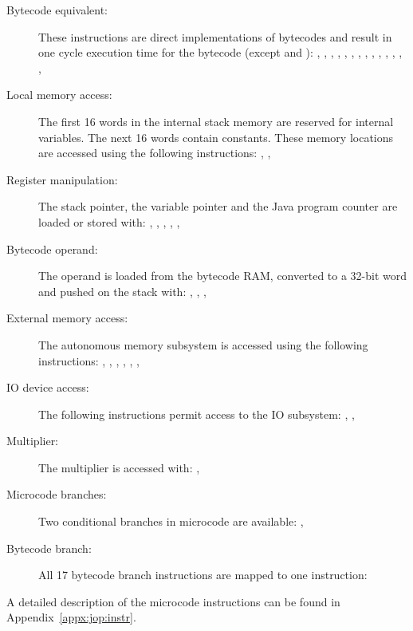 \begin{description}
    \item[Bytecode equivalent:]
These instructions are direct implementations of bytecodes and
result in one cycle execution time for the bytecode (except
 and ): , , ,
, , , , ,
, , , , ,
, 

    \item[Local memory access:]
The first 16 words in the internal stack memory are reserved for
internal variables. The next 16 words contain constants. These
memory locations are accessed using the following instructions:
, , 

    \item[Register manipulation:]
The stack pointer, the variable pointer and the Java program counter
are loaded or stored with: , , ,
, , 

    \item[Bytecode operand:]
The operand is loaded from the bytecode RAM, converted to a 32-bit
word and pushed on the stack with: ,
, , 

    \item[External memory access:]
The autonomous memory subsystem is accessed using the following
instructions: , , , ,
, , 

    \item[IO device access:]
The following instructions permit access to the IO subsystem:
, , 

    \item[Multiplier:]
The multiplier is accessed with: , 

    \item[Microcode branches:]
Two conditional branches in microcode are available: ,

    \item[Bytecode branch:]
All 17 bytecode branch instructions are mapped to one instruction:

\end{description}
%
A detailed description of the microcode instructions can be found in
Appendix~\ref{appx:jop:instr}.

